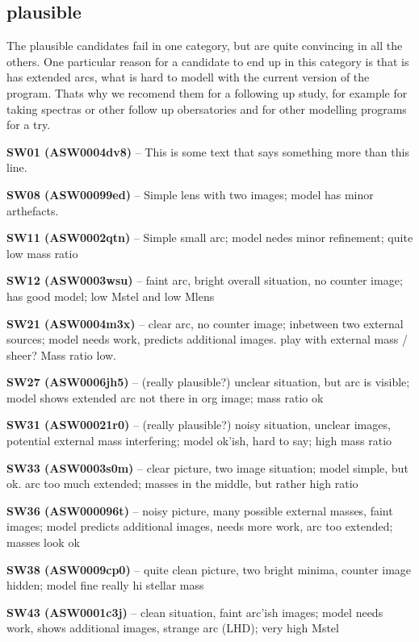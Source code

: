 \documentclass[fleqn,usenatbib]{mnras}
\newcommand{\lenstitle}[1]{\noindent\textbf{#1} --}
\begin{document}
\subsection{plausible}

The plausible candidates fail in one category, but are quite convincing in all the others.
One particular reason for a candidate to end up in this category is that is has extended arcs, what is hard to modell with the current version of the program.
Thats why we recomend them for a following up study, for example for taking spectras or other follow up obersatories and for other modelling programs for a try.


\lenstitle{SW01 (ASW0004dv8)}
  This is some text that says something more than this line.

\lenstitle{SW08 (ASW00099ed)}
  Simple lens with two images;
  model has minor arthefacts.

\lenstitle{SW11 (ASW0002qtn)}
  Simple small arc;
  model nedes minor refinement;
  quite low mass ratio
  
\lenstitle{SW12 (ASW0003wsu)} 
  faint arc, bright overall situation, no counter image;
  has good model;
  low Mstel and low Mlens
  
\lenstitle{SW21 (ASW0004m3x)} 
  clear arc, no counter image; inbetween two external sources;
  model needs work, predicts additional images. play with external mass / sheer?
  Mass ratio low.
  
\lenstitle{SW27 (ASW0006jh5)} 
  (really plausible?)
  unclear situation, but arc is visible;
  model shows extended arc not there in org image;
  mass ratio ok
  
\lenstitle{SW31 (ASW00021r0)} 
  (really plausible?)
  noisy situation, unclear images, potential external mass interfering;
  model ok'ish, hard to say;
  high mass ratio
  
\lenstitle{SW33 (ASW0003s0m)}
  clear picture, two image situation;
  model simple, but ok. arc too much extended;
  masses in the middle, but rather high ratio
  
\lenstitle{SW36 (ASW000096t)} 
  noisy picture, many possible external masses, faint images;
  model predicts additional images, needs more work, arc too extended;
  masses look ok
  
\lenstitle{SW38 (ASW0009cp0)} 
  quite clean picture, two bright minima, counter image hidden;
  model fine
  really hi stellar mass
  
\lenstitle{SW43 (ASW0001c3j)} 
  clean situation, faint arc'ish images;
  model needs work, shows additional images, strange arc (LHD);
  very high Mstel
  
\end{document}
